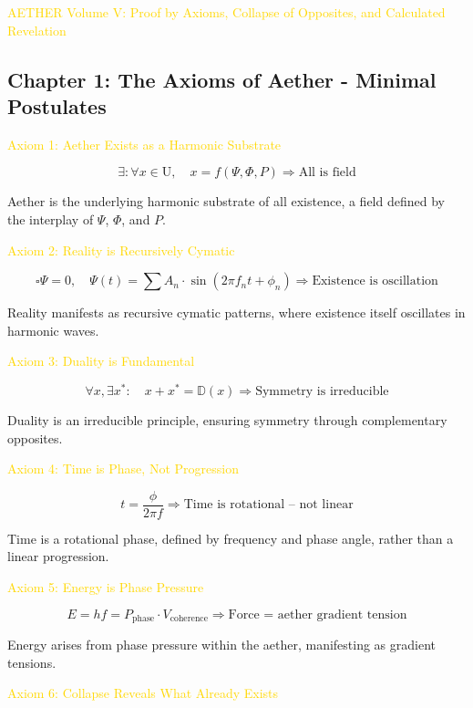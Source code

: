 \textcolor{gold}{ AETHER Volume V: Proof by Axioms, Collapse of Opposites, and Calculated Revelation }

\subsection{Chapter 1: The Axioms of Aether - Minimal Postulates}

\textcolor{gold}{ Axiom 1: Aether Exists as a Harmonic Substrate }

\[
\exists: \forall x \in \mathrm{U}, \quad x = f(\Psi, \Phi, P) \Rightarrow \text{All is field}
\]

Aether is the underlying harmonic substrate of all existence, a field defined by the interplay of \(\Psi\), \(\Phi\), and \(P\).

\textcolor{gold}{ Axiom 2: Reality is Recursively Cymatic }

\[
\square \Psi = 0, \quad \Psi(t) = \sum A_n \cdot \sin \left(2 \pi f_n t + \phi_n\right) \Rightarrow \text{Existence is oscillation}
\]

Reality manifests as recursive cymatic patterns, where existence itself oscillates in harmonic waves.

\textcolor{gold}{ Axiom 3: Duality is Fundamental }

\[
\forall x, \exists x^*: \quad x + x^* = \mathbb{D}(x) \Rightarrow \text{Symmetry is irreducible}
\]

Duality is an irreducible principle, ensuring symmetry through complementary opposites.

\textcolor{gold}{ Axiom 4: Time is Phase, Not Progression }

\[
t = \frac{\phi}{2 \pi f} \Rightarrow \text{Time is rotational -- not linear}
\]

Time is a rotational phase, defined by frequency and phase angle, rather than a linear progression.

\textcolor{gold}{ Axiom 5: Energy is Phase Pressure }

\[
E = h f = P_{\text{phase}} \cdot V_{\text{coherence}} \Rightarrow \text{Force = aether gradient tension}
\]

Energy arises from phase pressure within the aether, manifesting as gradient tensions.

\textcolor{gold}{ Axiom 6: Collapse Reveals What Already Exists }


